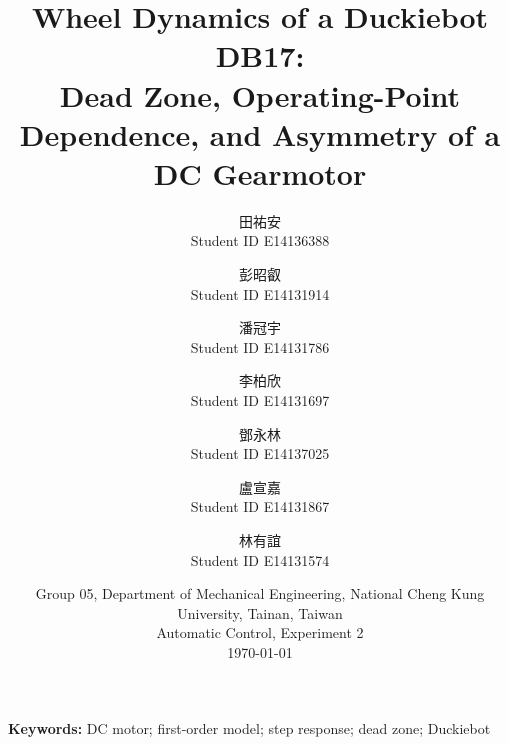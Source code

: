 \documentclass[10pt,a4paper,twocolumn]{article}
\title{Wheel Dynamics of a Duckiebot DB17:\\
    \large Dead Zone, Operating-Point Dependence, and Asymmetry of a DC Gearmotor}
\author{%
  田祐安\\ \small Student ID E14136388
  \and
  彭昭叡\\ \small Student ID E14131914
  \and
  潘冠宇\\ \small Student ID E14131786
  \and
  李柏欣\\ \small Student ID E14131697
  \and
  鄧永林\\ \small Student ID E14137025
  \and
  盧宣嘉\\ \small Student ID E14131867
  \and
  林有誼\\ \small Student ID E14131574}
\date{\small Group 05, Department of Mechanical Engineering, National Cheng Kung University, Tainan, Taiwan \\
  \small Automatic Control, Experiment 2 \\[1ex]
  \today}
\begin{document}
\maketitle



\noindent\textbf{Keywords:} DC motor; first-order model; step response; dead zone; Duckiebot










\printbibliography
\end{document}
